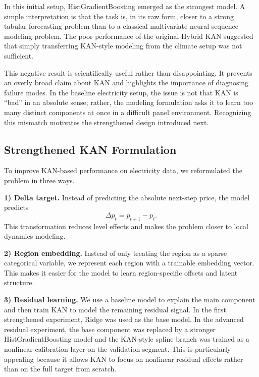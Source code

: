 \documentclass[10pt,conference,onecolumn]{IEEEtran}
\begin{document}
In this initial setup, HistGradientBoosting emerged as the strongest model. A simple interpretation is that the task is, in its raw form, closer to a strong tabular forecasting problem than to a classical multivariate neural sequence modeling problem. The poor performance of the original Hybrid KAN suggested that simply transferring KAN-style modeling from the climate setup was not sufficient.

This negative result is scientifically useful rather than disappointing. It prevents an overly broad claim about KAN and highlights the importance of diagnosing failure modes. In the baseline electricity setup, the issue is not that KAN is ``bad'' in an absolute sense; rather, the modeling formulation asks it to learn too many distinct components at once in a difficult panel environment. Recognizing this mismatch motivates the strengthened design introduced next.

\subsection{Strengthened KAN Formulation}

To improve KAN-based performance on electricity data, we reformulated the problem in three ways.

\textbf{1) Delta target.} Instead of predicting the absolute next-step price, the model predicts
\begin{equation}
\Delta p_t = p_{t+1} - p_t.
\end{equation}
This transformation reduces level effects and makes the problem closer to local dynamics modeling.

\textbf{2) Region embedding.} Instead of only treating the region as a sparse categorical variable, we represent each region with a trainable embedding vector. This makes it easier for the model to learn region-specific offsets and latent structure.

\textbf{3) Residual learning.} We use a baseline model to explain the main component and then train KAN to model the remaining residual signal. In the first strengthened experiment, Ridge was used as the base model. In the advanced residual experiment, the base component was replaced by a stronger HistGradientBoosting model and the KAN-style spline branch was trained as a nonlinear calibration layer on the validation segment. This is particularly appealing because it allows KAN to focus on nonlinear residual effects rather than on the full target from scratch.
\end{document}
